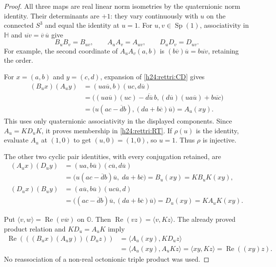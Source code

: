 \begin{proof}
All three maps are real linear norm isometries by the quaternionic
norm identity. Their determinants are $+1$: they vary continuously
with $u$ on the connected $S^3$ and equal the identity at $u=1$.
For $u,v\in\operatorname{Sp}(1)$, associativity in $\mathbb H$
and $\overline{uv}=\overline v\,\overline u$ give
\[
 B_uB_v=B_{uv},\qquad A_uA_v=A_{uv},\qquad D_uD_v=D_{uv}.
\]
For example, the second coordinate of $A_uA_v(a,b)$ is
$(b\overline v)\overline u=b\overline{uv}$, retaining the order.

For $x=(a,b)$ and $y=(c,d)$, expansion of
\eqref{h24:rettri:CD} gives
\begin{align*}
 (B_u x)(A_u y)
 &= (u a\overline u,b)(u c,d\overline u)\\
 &=\bigl((u a\overline u)(u c)
          -\overline{d\overline u}\,b,
          (d\overline u)(u a\overline u)
             +b\overline{u c}\bigr)\\
 &=\bigl(u(ac-\overline d b),
                    (da+b\overline c)\overline u\bigr)
 =A_u(xy).
\end{align*}
This uses only quaternionic associativity in the displayed
components. Since $A_u=K D_u K$, it proves membership in
\eqref{h24:rettri:RT}. If $\rho(u)$ is the identity, evaluate
$A_u$ at $(1,0)$ to get $(u,0)=(1,0)$, so $u=1$.
Thus $\rho$ is injective.

The other two cyclic pair identities, with every conjugation
retained, are
\begin{align*}
 (A_u x)(D_u y)
 &=(u a,b\overline u)(c\overline u,d\overline u)\\
 &=\bigl(u(ac-\overline d b)\overline u,\;da+b\overline c\bigr)
 =B_u(xy)=K B_u K(xy),\\
 (D_u x)(B_u y)
 &=(a\overline u,b\overline u)(u c\overline u,d)\\
 &=\bigl((ac-\overline d b)\overline u,
                    (da+b\overline c)\overline u\bigr)
 =D_u(xy)=K A_u K(xy).
\end{align*}

Put $\langle v,w\rangle=\operatorname{Re}(v\overline w)$ on
$\mathbb O$. Then $\operatorname{Re}(vz)=\langle v,Kz\rangle$.
The already proved product relation and $K D_u=A_u K$ imply
\begin{align*}
 \operatorname{Re}(((B_u x)(A_u y))(D_u z))
 &=\langle A_u(xy),K D_u z\rangle\\
 &=\langle A_u(xy),A_u Kz\rangle
 =\langle xy,Kz\rangle
 =\operatorname{Re}((xy)z).
\end{align*}
No reassociation of a non-real octonionic triple product was used.
\end{proof}

